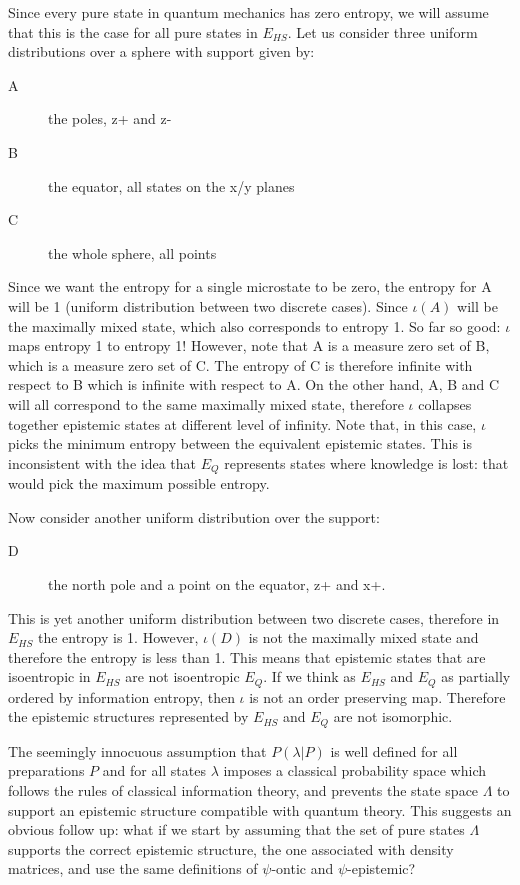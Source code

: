 \documentclass[10pt,twocolumn, nofootinbib]{revtex4-2}
\begin{document}
Since every pure state in quantum mechanics has zero entropy, we will assume that this is the case for all pure states in $E_{HS}$. Let us consider three uniform distributions over a sphere with support given by:
\begin{description}
	\item[A] the poles, z+ and z-
	\item[B] the equator, all states on the x/y planes
	\item[C] the whole sphere, all points
\end{description}
Since we want the entropy for a single microstate to be zero, the entropy for A will be 1 (uniform distribution between two discrete cases). Since $\iota(A)$ will be the maximally mixed state, which also corresponds to entropy 1. So far so good: $\iota$ maps entropy 1 to entropy 1! However, note that A is a measure zero set of B, which is a measure zero set of C. The entropy of C is therefore infinite with respect to B which is infinite with respect to A. On the other hand, A, B and C will all correspond to the same maximally mixed state, therefore $\iota$ collapses together epistemic states at different level of infinity. Note that, in this case, $\iota$ picks the minimum entropy between the equivalent epistemic states. This is inconsistent with the idea that $E_{Q}$ represents states where knowledge is lost: that would pick the maximum possible entropy.

Now consider another uniform distribution over the support:
\begin{description}
	\item[D] the north pole and a point on the equator, z+ and x+.
\end{description}
This is yet another uniform distribution between two discrete cases, therefore in $E_{HS}$ the entropy is 1. However, $\iota(D)$ is not the maximally mixed state and therefore the entropy is less than 1. This means that epistemic states that are isoentropic in $E_{HS}$ are not isoentropic $E_{Q}$. If we think as $E_{HS}$ and $E_{Q}$ as partially ordered by information entropy, then $\iota$ is not an order preserving map. Therefore the epistemic structures represented by $E_{HS}$ and $E_{Q}$ are not isomorphic.

The seemingly innocuous assumption that $P(\lambda|P)$ is well defined for all preparations $P$ and for all states $\lambda$ imposes a classical probability space which follows the rules of classical information theory, and prevents the state space $\Lambda$ to support an epistemic structure compatible with quantum theory. This suggests an obvious follow up: what if we start by assuming that the set of pure states $\Lambda$ supports the correct epistemic structure, the one associated with density matrices, and use the same definitions of $\psi$-ontic and $\psi$-epistemic?
\end{document}
